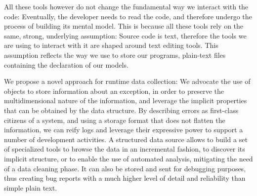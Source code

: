 All these tools however do not change the fundamental way we interact with the code: Eventually, the developer needs to read the code, and therefore undergo the process of building its mental model.
This is because all these tools rely on the same, strong, underlying assumption: Source code is text, therefore the tools we are using to interact with it are shaped around text editing tools.
This assumption reflects the way we use to store our programs, \ie plain-text files containing the declaration of our models.

We propose a novel approach for runtime data collection: We advocate the use of objects to store information about an exception, in order to preserve the multidimensional nature of the information, and leverage the implicit properties that can be obtained by the data structure.
By describing errors as first-class citizens of a system, and using a storage format that does not flatten the information, we can reify logs and leverage their expressive power to support a number of development activities.
A structured data source allows to build a set of specialized tools to browse the data in an incremental fashion, to discover its implicit structure, or to enable the use of automated analysis, mitigating the need of a data cleaning phase.
It can also be stored and sent for debugging purposes, thus creating bug reports with a much higher level of detail and reliability than simple plain text.


